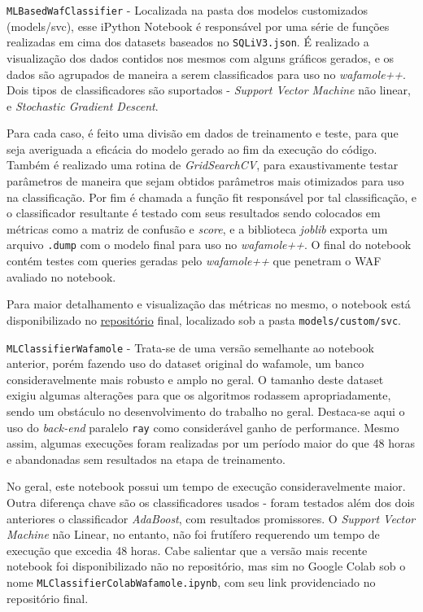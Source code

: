 \begin{alineas}
\begin{alineas}
\end{alineas}
\item \verb+MLBasedWafClassifier+ - Localizada na pasta dos modelos customizados (models/svc), esse iPython Notebook é responsável por uma série de funções realizadas em cima dos datasets baseados no \verb+SQLiV3.json+. É realizado a visualização dos dados contidos nos mesmos com alguns gráficos gerados, e os dados são agrupados de maneira a serem classificados para uso no \textit{wafamole++}. Dois tipos de classificadores são suportados - \textit{Support Vector Machine} não linear, e \textit{Stochastic Gradient Descent}. 

Para cada caso, é feito uma divisão em dados de treinamento e teste, para que seja averiguada a eficácia do modelo gerado ao fim da execução do código. Também é realizado uma rotina de \textit{GridSearchCV}, para exaustivamente testar parâmetros de maneira que sejam obtidos parâmetros mais otimizados para uso na classificação. Por fim é chamada a função fit responsável por tal classificação, e o classificador resultante é testado com seus resultados sendo colocados em métricas como a matriz de confusão e \textit{score}, e a biblioteca \textit{joblib} exporta um arquivo \verb+.dump+ com o modelo final para uso no \textit{wafamole++}. O final do notebook contém testes com queries geradas pelo \textit{wafamole++} que penetram o WAF avaliado no notebook.

Para maior detalhamento e visualização das métricas no mesmo, o notebook está disponibilizado no \href{https://github.com/nidnogg/tcc}{repositório} final, localizado sob a pasta \verb+models/custom/svc+.

\item \verb+MLClassifierWafamole+ - Trata-se de uma versão semelhante ao notebook anterior, porém fazendo uso do dataset original do wafamole, um banco consideravelmente mais robusto e amplo no geral. O tamanho deste dataset exigiu algumas alterações para que os algoritmos rodassem apropriadamente, sendo um obstáculo no desenvolvimento do trabalho no geral. Destaca-se aqui o uso do \textit{back-end} paralelo \verb+ray+ \cite{ray_backend_parallel} como considerável ganho de performance. Mesmo assim, algumas execuções foram realizadas por um período maior do que 48 horas e abandonadas sem resultados na etapa de treinamento.

No geral, este notebook possui um tempo de execução consideravelmente maior. Outra diferença chave são os classificadores usados - foram testados além dos dois anteriores o classificador \textit{AdaBoost}, com resultados promissores. O \textit{Support Vector Machine} não Linear, no entanto, não foi frutífero requerendo um tempo de execução que excedia 48 horas. Cabe salientar que a versão mais recente notebook foi disponibilizado não no repositório, mas sim no Google Colab sob o nome \verb+MLClassifierColabWafamole.ipynb+, com seu link providenciado no repositório final.
\end{alineas}


